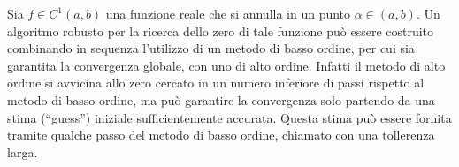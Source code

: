 Sia $f\in C^{1}\left(a, b\right)$ una funzione reale che si annulla in
un punto $\alpha\in (a, b)$. Un algoritmo robusto per la
ricerca dello zero di tale funzione pu\`o essere costruito combinando in sequenza l'utilizzo di
un metodo di basso ordine, per cui sia garantita la convergenza globale,
con uno di alto ordine.
Infatti il metodo di alto ordine si avvicina allo zero cercato in un numero inferiore di passi rispetto al metodo di basso ordine, ma pu\`o garantire la convergenza solo partendo da una stima (``guess'') iniziale sufficientemente accurata. Questa stima pu\`o essere fornita tramite qualche passo del metodo di basso ordine, chiamato con una tollerenza larga.
